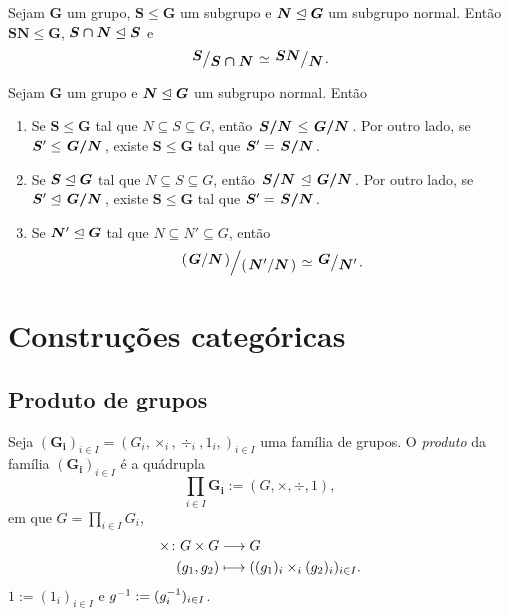 \begin{theorem}
Sejam $\bm G$ um grupo, $\bm S \leq \bm G$ um subgrupo e $\bm N \mathrel{\unlhd} \bm G$ um subgrupo normal. Então $\bm{SN} \leq \bm G$, $\bm{S \cap N} \mathrel{\unlhd} \bm S$ e
	\begin{equation*}
	\bm{\quo{S}{S \cap N}} \simeq \bm{\quo{SN}{N}}.
	\end{equation*}
\end{theorem}

\begin{theorem}
Sejam $\bm G$ um grupo e $\bm N \mathrel{\unlhd} \bm G$ um subgrupo normal. Então
	\begin{enumerate}
	\item Se $\bm S \leq \bm G$ tal que $N \subseteq S \subseteq G$, então $\bm{\quo{S}{N}} \leq \bm{\quo{G}{N}}$. Por outro lado, se $\bm S' \leq \bm{\quo{G}{N}}$, existe $\bm S \leq \bm G$ tal que $\bm S' = \bm{\quo{S}{N}}$.
	\item Se $\bm S \mathrel{\unlhd} \bm G$ tal que $N \subseteq S \subseteq G$, então $\bm{\quo{S}{N}} \ide \bm{\quo{G}{N}}$. Por outro lado, se $\bm S' \ide \bm{\quo{G}{N}}$, existe $\bm S \leq \bm G$ tal que $\bm S' = \bm{\quo{S}{N}}$.
	\item Se $\bm N' \mathrel{\unlhd} \bm G$ tal que $N \subseteq N' \subseteq G$, então
		\begin{equation*}
		\quo{\left(\quo{\bm G}{\bm N}\right)}{\left(\quo{\bm N'}{\bm N}\right)} \simeq \quo{\bm G}{\bm N'}.
		\end{equation*}
	\end{enumerate}
\end{theorem}


\cleardoublepage
\section{Construções categóricas}

\subsection{Produto de grupos}

\begin{definition}
Seja $(\bm{G_i})_{i \in I}=(G_i,\times_i,\div_i,1_i,)_{i \in I}$ uma família de grupos. O \emph{produto} da família $(\bm{G_i})_{i \in I}$ é a quádrupla
	\begin{equation*}
	\prod_{i \in I} \bm{G_i} := (G,\times,\div,1),
	\end{equation*}
em que $G = \prod_{i \in I} G_i$,
	\begin{align*}
	{\times}\colon {G \times G} &\longrightarrow {G} \\{(g_1,g_2)} &\longmapsto ((g_1)_i \times_i (g_2)_i)_{i \in I}.
	\end{align*}
$1 := (1_i)_{i \in I}$ e $g^{-1} := (g_i^{-1})_{i \in I}$.
\end{definition}

